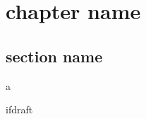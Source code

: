 \documentclass[11pt,dvipdfmx,a4paper]{jsreport}
\begin{document}
\fi

\chapter{chapter name}
\section{section name}
a

\expandafter\ifx\csname ifdraft\endcsname\relax
    
    

    
\end{document}
